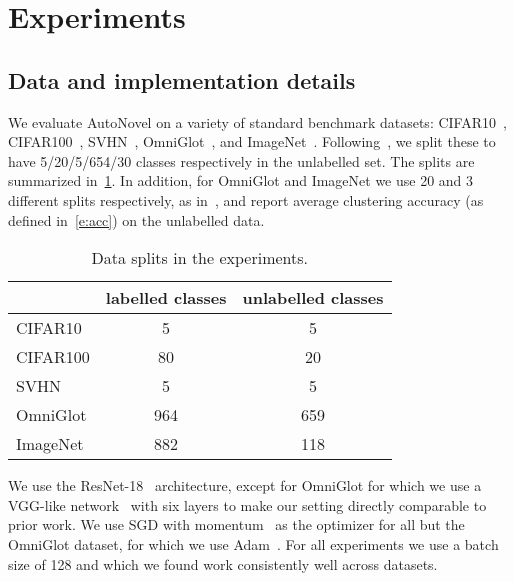 \section{Experiments}\label{sec:exp}

\subsection{Data and implementation details}\label{sec:exp:imp}

We evaluate AutoNovel on a variety of standard benchmark datasets:
CIFAR10~\cite{Krizhevsky09cifar}, CIFAR100~\cite{Krizhevsky09cifar}, SVHN~\cite{Netzer2011svhn}, OmniGlot~\cite{Lake15omnniglot}, and ImageNet~\cite{deng09imagnet}.  Following~\cite{han2019learning}, we split these to have
 5/20/5/654/30 classes respectively in the unlabelled set. The splits are summarized in~\cref{tab:datasplit}.
In addition, for OmniGlot and ImageNet we use 20 and 3 different splits respectively, as in~\cite{han2019learning}, and report average clustering accuracy (as defined in~\cref{e:acc}) on the unlabelled data.

\begin{table}[ht]
\centering
\footnotesize
\caption{Data splits in the experiments.}\label{tab:datasplit}
\begin{tabular}{lcc}
\toprule
& labelled classes & unlabelled classes \\
\midrule
CIFAR10 & 5 & 5 \\
CIFAR100 & 80 &  20 \\
SVHN & 5  & 5 \\
OmniGlot & 964  & 659 \\
ImageNet & 882 & 118 \\
\bottomrule
\end{tabular}
\end{table}




We use the ResNet-18~\cite{he2016deep} architecture, except for OmniGlot for which we use a VGG-like network~\cite{simonyan15vgg} with six layers to make our setting directly comparable to prior work.
We use SGD with momentum~\cite{sutskever2013importance} as the optimizer for all but the OmniGlot dataset, for which we use Adam~\cite{kingma2014adam}.
For all experiments we use a batch size of 128 and  which we found work consistently well across datasets.

